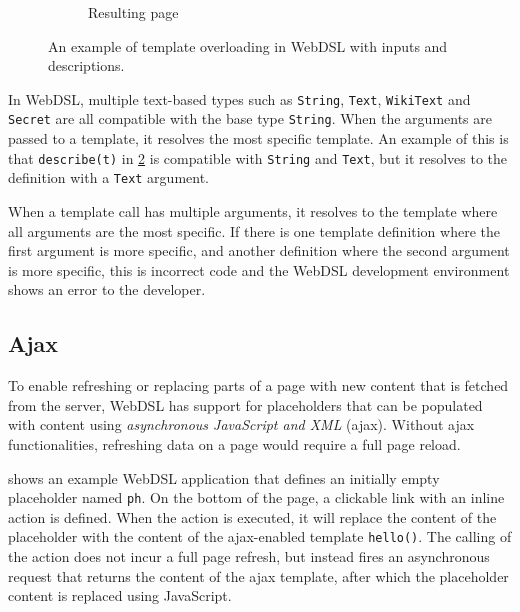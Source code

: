 \begin{figure}
\begin{subfigure}[t]{0.55\textwidth}
          \caption{\label{fig:webdsl-template-overloading-page}Resulting page}
        \end{subfigure}
      \caption{\label{fig:webdsl-template-overloading}An example of template overloading in WebDSL with inputs and descriptions.}
      \end{figure}

      In WebDSL, multiple text-based types such as \texttt{String}, \texttt{Text}, \texttt{WikiText} and \texttt{Secret} are all compatible with the base type \texttt{String}. When the arguments are passed to a template, it resolves the most specific template. An example of this is that \texttt{describe(t)} in \cref{fig:webdsl-template-overloading} is compatible with \texttt{String} and \texttt{Text}, but it resolves to the definition with a \texttt{Text} argument.

      When a template call has multiple arguments, it resolves to the template where all arguments are the most specific. If there is one template definition where the first argument is more specific, and another definition where the second argument is more specific, this is incorrect code and the WebDSL development environment shows an error to the developer.

    \subsection{\label{subsec:ajax}Ajax}

      To enable refreshing or replacing parts of a page with new content that is fetched from the server, WebDSL has support for placeholders that can be populated with content using \textit{asynchronous JavaScript and XML} (ajax). Without ajax functionalities, refreshing data on a page would require a full page reload.

       shows an example WebDSL application that defines an initially empty placeholder named \texttt{ph}. On the bottom of the page, a clickable link with an inline action is defined. When the action is executed, it will replace the content of the placeholder with the content of the ajax-enabled template \texttt{hello()}. The calling of the action does not incur a full page refresh, but instead fires an asynchronous request that returns the content of the ajax template, after which the placeholder content is replaced using JavaScript.

